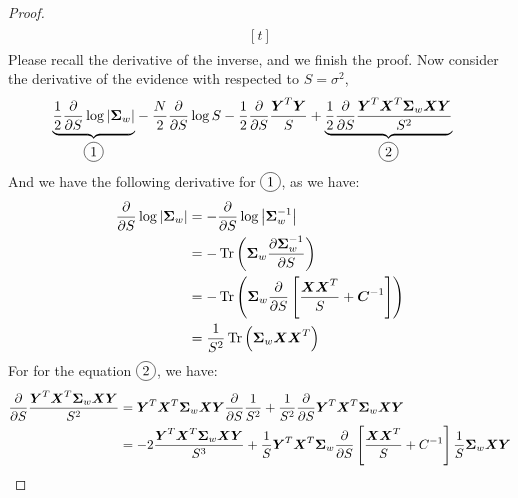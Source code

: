 \begin{proof}
\begin{equation*}
\begin{aligned}
\begin{aligned}[t]
        \end{aligned} 
    \end{aligned}
    \end{equation*}
    Please recall the derivative of the inverse, and we finish the proof. Now consider the derivative of the evidence with respected to $S = \sigma^2$, 
    \begin{equation*}
    \begin{aligned}
        \underbrace{\frac{1}{2}\frac{\partial}{\partial S}\log\abs{\boldsymbol \Sigma_w}}_{\circled{1}} &- \frac{N}{2}\frac{\partial }{\partial S} \log S -\frac{1}{2}\frac{\partial }{\partial S}\frac{\boldsymbol Y^T\boldsymbol Y}{S} + \underbrace{\frac{1}{2}\frac{\partial }{\partial S}\frac{\boldsymbol Y^T\boldsymbol X^T\boldsymbol \Sigma_w\boldsymbol X\boldsymbol Y}{S^2} }_{\circled{2}}
    \end{aligned}
    \end{equation*}
    And we have the following derivative for $\circled{1}$, as we have:
    \begin{equation*}
    \begin{aligned}
        \frac{\partial}{\partial S}\log\left| \boldsymbol \Sigma_w \right| &= -\frac{\partial}{\partial S}\log\left| \boldsymbol \Sigma_w^{-1} \right| \\
        &=- \operatorname{Tr}\left( \boldsymbol \Sigma_w\frac{\partial \boldsymbol \Sigma_w^{-1}}{\partial S} \right) \\
        &=- \operatorname{Tr}\left( \boldsymbol \Sigma_w\frac{\partial}{\partial S}\left[ \frac{\boldsymbol X\boldsymbol X^T}{S} + \boldsymbol C^{-1} \right] \right) \\
        &=\frac{1}{S^2} \operatorname{Tr}\left( \boldsymbol \Sigma_w\boldsymbol X\boldsymbol X^T \right) \\
    \end{aligned}
    \end{equation*}
    For for the equation $\circled{2}$, we have:
    \begin{equation*}
    \begin{aligned}
        \frac{\partial }{\partial S}\frac{\boldsymbol Y^T\boldsymbol X^T\boldsymbol \Sigma_w\boldsymbol X\boldsymbol Y}{S^2} &= \boldsymbol Y^T\boldsymbol X^T\boldsymbol \Sigma_w\boldsymbol X\boldsymbol Y\frac{\partial }{\partial S}\frac{1}{S^2} + \frac{1}{S^2}\frac{\partial }{\partial S}\boldsymbol Y^T\boldsymbol X^T\boldsymbol \Sigma_w\boldsymbol X\boldsymbol Y \\
        &= -2\frac{\boldsymbol Y^T\boldsymbol X^T\boldsymbol \Sigma_w\boldsymbol X\boldsymbol Y}{S^3} + \frac{1}{S}\boldsymbol Y^T\boldsymbol X^T\boldsymbol \Sigma_w\frac{\partial }{\partial S}\brackb{\frac{\boldsymbol X\boldsymbol X^T}{S} + C^{-1}}\frac{1}{S}\boldsymbol \Sigma_w\boldsymbol X\boldsymbol Y \\

\end{aligned}
\end{equation*}
\end{proof}
